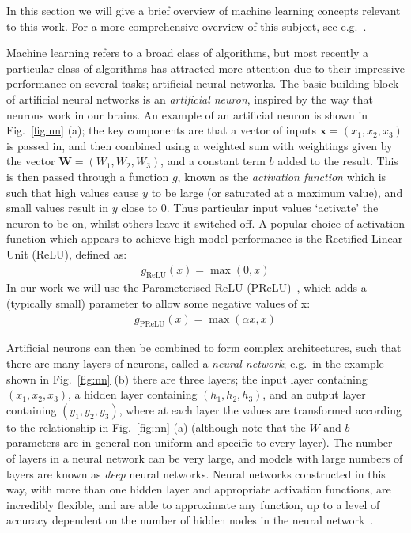 \documentclass[../main.tex]{subfiles}
\begin{document}
In this section we will give a brief overview of machine learning concepts  relevant to this work. For a more comprehensive overview of this subject, see e.g.~\cite{bishop_pattern_2006, goodfellow_deep_2016, nielsen_neural_2015}.

Machine learning refers to a broad class of algorithms, but most recently a particular class of algorithms has attracted more attention due to their impressive performance on several tasks; artificial neural networks. The basic building block of artificial neural networks is an \emph{artificial neuron}, inspired by the way that neurons work in our brains. An example of an artificial neuron is shown in Fig.~\ref{fig:nn} (a); the key components are that a vector of inputs $\mathbf{x} = (x_1, x_2, x_3)$ is passed in, and then combined using a weighted sum with weightings given by the vector $\mathbf{W}=(W_1, W_2, W_3)$, and a constant term $b$ added to the result. This is then passed through a function $g$, known as the \emph{activation function} which is such that high values cause $y$ to be large (or saturated at a maximum value), and small values result in $y$ close to 0. Thus particular input values `activate' the neuron to be on, whilst others leave it switched off. A popular choice of activation function which appears to achieve high model performance is the Rectified Linear Unit (ReLU), defined as:
\begin{align}
    g_{\textrm{ReLU}}(x) = \max(0, x)
\end{align}
In our work we will use the Parameterised ReLU (PReLU)~\citep{he_delving_2015}, which adds a (typically small) parameter to allow some negative values of x:
\begin{align}
    g_{\textrm{PReLU}}(x) = \max(\alpha x, x)
\end{align}

Artificial neurons can then be combined to form complex architectures, such that there are many layers of neurons, called a \emph{neural network}; e.g.~in the example shown in Fig.~\ref{fig:nn} (b) there are three layers; the input layer containing $(x_1, x_2, x_3)$, a hidden layer containing $(h_1, h_2, h_3)$, and an output layer containing $(y_1, y_2, y_3)$, where at each layer the values are transformed according to the relationship in Fig.~\ref{fig:nn} (a) (although note that the $W$ and $b$ parameters are in general non-uniform and specific to every layer). The number of layers in a neural network can be very large, and models with large numbers of layers are known as \emph{deep} neural networks. Neural networks constructed in this way, with more than one hidden layer and appropriate activation functions, are incredibly flexible, and are able to approximate any function, up to a level of accuracy dependent on the number of hidden nodes in the neural network~\citep{goodfellow_deep_2016}.
\end{document}
